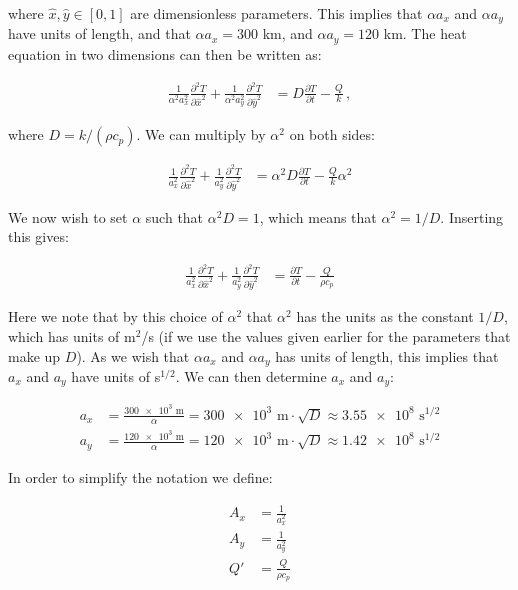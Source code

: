 \documentclass[reprint,english,notitlepage]{revtex4-1}  %
\begin{document}
where $\hat{x},\hat{y} \in [0,1]$ are dimensionless parameters. This implies that $\alpha a_x$ and $\alpha a_y$ have units of length, and that $\alpha a_x = 300$ km, and $\alpha a_y = 120$ km. The heat equation in two dimensions can then be written as:

\begin{align*}
\frac{1}{\alpha^2 a_x^2}\frac{\partial^2 T}{\partial \hat{x}^2} + \frac{1}{\alpha^2 a_y^2} \frac{\partial^2 T}{\partial \hat{y}^2} &= D\frac{\partial T}{\partial t} - \frac{Q}{k} \, ,
\end{align*} 

where $D = k/(\rho c_p)$. We can multiply by $\alpha^2$ on both sides:

\begin{align*}
\frac{1}{a_x^2}\frac{\partial^2 T}{\partial \hat{x}^2} + \frac{1}{a_y^2} \frac{\partial^2 T}{\partial \hat{y}^2} &= \alpha^2 D \frac{\partial T}{\partial t} - \frac{Q}{k}\alpha^2 
\end{align*}

We now wish to set $\alpha$ such that $\alpha^2 D = 1$, which means that $\alpha^2 = 1/D$. Inserting this gives:

\begin{align*}
\frac{1}{a_x^2} \frac{\partial^2 T}{\partial \hat{x}^2} + \frac{1}{a_y^2} \frac{\partial^2 T}{\partial \hat{y}^2} &=  \frac{\partial T}{\partial t} - \frac{Q}{\rho c_p}
\end{align*}

Here we note that by this choice of $\alpha^2 $ that $\alpha^2$ has the units as the constant $1/D$, which has units of m$^2$/s (if we use the values given earlier for the parameters that make up $D$). As we wish that $\alpha a_x$ and $\alpha a_y$ has units of length, this implies that $a_x$ and $a_y$ have units of s$^{1/2}$. We can then determine $a_x$ and $a_y$:

\begin{align*}
a_x &= \frac{\num{300e3} \text{ m}}{\alpha} = \num{300e3}\text{ m} \cdot \sqrt{D} \approx \num{3.55e8} \text{ s}^{1/2} \\
a_y &= \frac{\num{120e3} \text{ m}}{\alpha} = \num{120e3}\text{ m} \cdot \sqrt{D} \approx \num{1.42e8} \text{ s}^{1/2}
\end{align*}

In order to simplify the notation we define:

\begin{align*}
A_x &= \frac{1}{a_x^2} \\
A_y &= \frac{1}{a_y^2} \\
Q' &= \frac{Q}{\rho c_p}
\end{align*}
\end{document}
